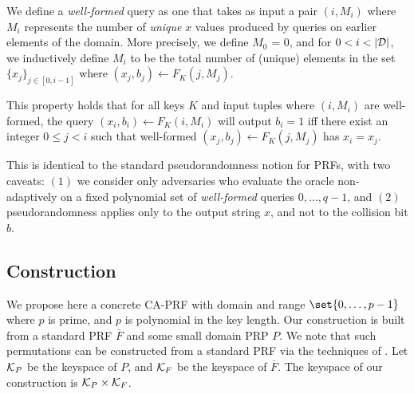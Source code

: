 We define a {\em well-formed} query as one that takes as input a pair $(i, M_i)$ where $M_i$ represents the number of {\em unique} $x$ values produced by queries on earlier elements of the domain.
More precisely, we define $M_0$ = 0, and for $0 < i < |\mathcal{D}|$, we inductively define $M_i$ to be the total number of (unique) elements in the set $\{x_j\}_{j \in [0,i-1]}$ where $(x_j, b_j) \leftarrow F_K(j, M_j)$.

\begin{definition}
	This property holds that for all keys $K$ and input tuples where $(i, M_i)$ are well-formed, the query $(x_i, b_i) \leftarrow F_K(i, M_i)$ will output $b_i=1$ iff there exist an integer $0 \le j < i$ such that well-formed $(x_j, b_j) \leftarrow F_K(j, M_j)$ has $x_i = x_j$.
\end{definition}

\begin{definition}
	This is identical to the standard pseudorandomness notion for PRFs, with two caveats: $(1)$ we consider only adversaries who evaluate the oracle non-adaptively on a fixed polynomial set of {\em well-formed} queries $0, \dots, q-1$, and $(2)$ pseudorandomness applies only to the output string $x$, and not to the collision bit $b$.
\end{definition}

\subsection{Construction}

\newcommand{\bprf}{\bar{F}}
\newcommand{\caprfSR}{\mathsf{SampleProb}}
\newcommand{\sampleprob}{\caprfSR}
\newcommand{\smallprp}{P}
\newcommand{\realprf}{F}

We propose here a concrete CA-PRF with domain and range $\set{0, \dots, p - 1}$ where $p$ is prime, and $p$ is polynomial in the key length.
Our construction is built from a standard PRF $\bprf$ and some small domain PRP $P$.
We note that such permutations can be constructed from a standard PRF via the techniques of \cite{RSA:BlaRog02, SAC:BRRS09}.
Let $\mathcal{K}_P$ be the keyspace of $P$, and $\mathcal{K}_F$ be the keyspace of $\bprf$.
The keyspace of our construction is $\mathcal{K}_P \times \mathcal{K}_{F}$.


